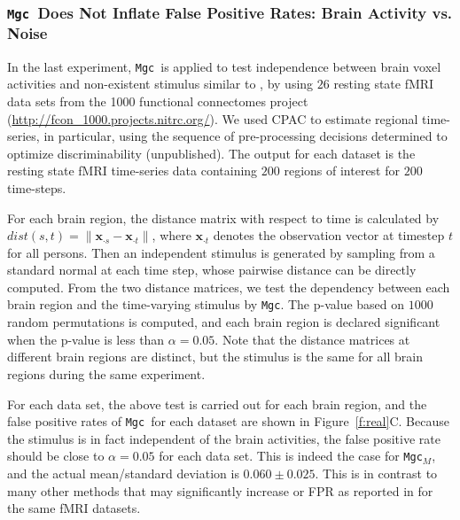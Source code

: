 \documentclass[11pt]{article}
\newcommand{\note}[2][]{\added[#1,remark={#2}]{}}
\providecommand{\sct}[1]{{\sc \texttt{#1}}}
\providecommand{\mb}[1]{\boldsymbol{#1}}
\newcommand{\Mgc}{\sct{Mgc}}
\newcommand{\Mgcm}{\sct{Mgc$_M$}}
\newcommand{\cs}[1]{{\note{cs: #1}}}
\newcommand{\mbx}{\ensuremath{\mb{x}}}
\begin{document}
\subsubsection[Correct False Positive Rate]{\Mgc~Does Not Inflate False Positive Rates: Brain Activity vs. Noise}

In the last experiment, \Mgc~is applied to test independence between brain voxel activities and non-existent stimulus similar to \cite{EklundKnutsson2012}, by using $26$ resting state fMRI data sets from the 1000 functional connectomes project (\url{http://fcon_1000.projects.nitrc.org/}). We used CPAC\cs{cite CPAC} to estimate regional time-series, in particular, using the sequence of pre-processing decisions determined to optimize discriminability (unpublished).  The output for each dataset is the resting state fMRI time-series data containing $200$ regions of interest for $200$ time-steps. 

For each brain region, the distance matrix with respect to time is calculated by $dist(s,t)=\|\mbx_{\cdot s}-\mbx_{\cdot t}\|$, where $\mbx_{\cdot t}$ denotes the observation vector at timestep $t$ for all persons. Then an independent stimulus is generated by sampling from a standard normal at each time step, whose pairwise distance can be directly computed. From the two distance matrices, we test the dependency between each brain region and the time-varying stimulus by \Mgc. The p-value based on $1000$ random permutations is computed, and each brain region is declared significant when the p-value is less than $\alpha=0.05$. Note that the distance matrices at different brain regions are distinct, but the stimulus is the same for all brain regions during the same experiment.

For each data set, the above test is carried out for each brain region, and the false positive rates of \Mgc~for each dataset are shown in Figure~\ref{f:real}C. %
Because the stimulus is in fact independent of the brain activities, the false positive rate should be close to $\alpha=0.05$ for each data set. This is indeed the case for \Mgcm, and the actual mean/standard deviation is $0.060 \pm 0.025$. This is in contrast to many other methods that may significantly increase or FPR as reported in \cite{EklundKnutsson2012} for the same fMRI datasets.
\end{document}
